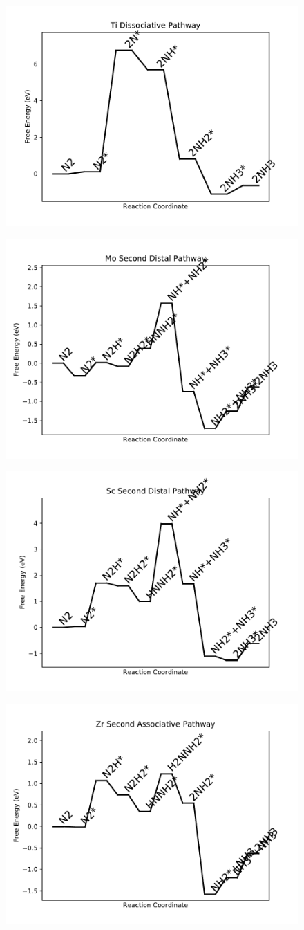 \begin{figure}
\includegraphics[width=0.5\linewidth]{data/plots/Ti_dissociative.pdf}
\label{fig:Ti_dissociative}
\end{figure}

\begin{figure}
\includegraphics[width=0.5\linewidth]{data/plots/Mo_distal_2.pdf}
\label{fig:Mo_distal_2}
\end{figure}

\begin{figure}
\includegraphics[width=0.5\linewidth]{data/plots/Sc_distal_2.pdf}
\label{fig:Sc_distal_2}
\end{figure}

\begin{figure}
\includegraphics[width=0.5\linewidth]{data/plots/Zr_associative_2.pdf}
\label{fig:Zr_associative_2}
\end{figure}

